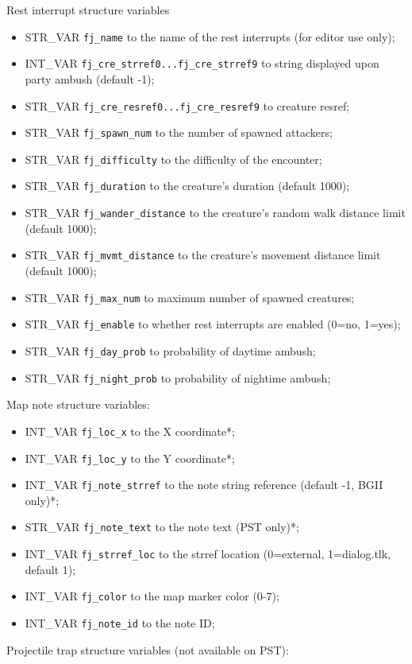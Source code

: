 \documentclass{article}
\begin{document}
Rest interrupt structure variables
\begin{itemize}
\item STR_VAR \verb+fj_name+ to the name of the rest interrupts (for editor use only);
\item INT_VAR \verb+fj_cre_strref0...fj_cre_strref9+ to string displayed upon party ambush (default -1);
\item STR_VAR \verb+fj_cre_resref0...fj_cre_resref9+ to creature resref;
\item STR_VAR \verb+fj_spawn_num+ to the number of spawned attackers;
\item STR_VAR \verb+fj_difficulty+ to the difficulty of the encounter;
\item STR_VAR \verb+fj_duration+ to the creature's duration (default 1000);
\item STR_VAR \verb+fj_wander_distance+ to the creature's random walk distance limit (default 1000);
\item STR_VAR \verb+fj_mvmt_distance+ to the creature's movement distance limit (default 1000);
\item STR_VAR \verb+fj_max_num+ to maximum number of spawned creatures;
\item STR_VAR \verb+fj_enable+ to whether rest interrupts are enabled (0=no, 1=yes);
\item STR_VAR \verb+fj_day_prob+ to probability of daytime ambush;
\item STR_VAR \verb+fj_night_prob+ to probability of nightime ambush;
\end{itemize}
Map note structure variables:
\begin{itemize}
\item INT_VAR \verb+fj_loc_x+ to the X coordinate*;
\item INT_VAR \verb+fj_loc_y+ to the Y coordinate*;
\item INT_VAR \verb+fj_note_strref+ to the note string reference (default -1, BGII only)*;
\item STR_VAR \verb+fj_note_text+ to the note text (PST only)*;
\item INT_VAR \verb+fj_strref_loc+ to the strref location (0=external, 1=dialog.tlk, default 1);
\item INT_VAR \verb+fj_color+ to the map marker color (0-7);
\item INT_VAR \verb+fj_note_id+ to the note ID;
\end{itemize}
Projectile trap structure variables (not available on PST):
\end{document}
